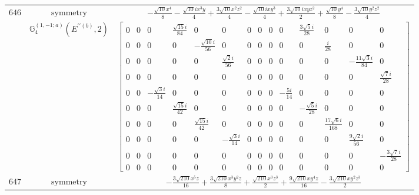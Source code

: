 \documentclass[fleqn,8pt,landscape]{jsarticle}
\begin{document}
\begin{longtable}{ccc}
$ 646 $ & $ \text{symmetry} $ & $ - \frac{\sqrt{10} x^{4}}{8} - \frac{\sqrt{10} i x^{3} y}{4} + \frac{3 \sqrt{10} x^{2} z^{2}}{4} - \frac{\sqrt{10} i x y^{3}}{4} + \frac{3 \sqrt{10} i x y z^{2}}{2} + \frac{\sqrt{10} y^{4}}{8} - \frac{3 \sqrt{10} y^{2} z^{2}}{4} $ \\
$  $ & $ \mathbb{G}_{4}^{(1,-1;a)}(E^{\prime\prime(b)},2) $ & $ \begin{bmatrix} 0 & 0 & 0 & \frac{\sqrt{15} i}{84} & 0 & 0 & 0 & 0 & 0 & 0 & \frac{3 \sqrt{5} i}{28} & 0 & 0 & 0 \\ 0 & 0 & 0 & 0 & - \frac{\sqrt{10} i}{56} & 0 & 0 & 0 & 0 & 0 & 0 & \frac{i}{28} & 0 & 0 \\ 0 & 0 & 0 & 0 & 0 & \frac{\sqrt{2} i}{56} & 0 & 0 & 0 & 0 & 0 & 0 & - \frac{11 \sqrt{3} i}{84} & 0 \\ 0 & 0 & 0 & 0 & 0 & 0 & 0 & 0 & 0 & 0 & 0 & 0 & 0 & \frac{\sqrt{7} i}{28} \\ 0 & 0 & - \frac{\sqrt{3} i}{14} & 0 & 0 & 0 & 0 & 0 & 0 & - \frac{5 i}{14} & 0 & 0 & 0 & 0 \\ 0 & 0 & 0 & \frac{\sqrt{15} i}{42} & 0 & 0 & 0 & 0 & 0 & 0 & - \frac{\sqrt{5} i}{28} & 0 & 0 & 0 \\ 0 & 0 & 0 & 0 & \frac{\sqrt{15} i}{42} & 0 & 0 & 0 & 0 & 0 & 0 & \frac{17 \sqrt{6} i}{168} & 0 & 0 \\ 0 & 0 & 0 & 0 & 0 & - \frac{\sqrt{3} i}{14} & 0 & 0 & 0 & 0 & 0 & 0 & \frac{9 \sqrt{2} i}{56} & 0 \\ 0 & 0 & 0 & 0 & 0 & 0 & 0 & 0 & 0 & 0 & 0 & 0 & 0 & - \frac{3 \sqrt{7} i}{28} \\ 0 & 0 & 0 & 0 & 0 & 0 & 0 & 0 & 0 & 0 & 0 & 0 & 0 & 0 \end{bmatrix} $ \\ \hline
$ 647 $ & $ \text{symmetry} $ & $ - \frac{3 \sqrt{210} x^{5} z}{16} + \frac{3 \sqrt{210} x^{3} y^{2} z}{8} + \frac{\sqrt{210} x^{3} z^{3}}{2} + \frac{9 \sqrt{210} x y^{4} z}{16} - \frac{3 \sqrt{210} x y^{2} z^{3}}{2} $ \\

\end{longtable}
\end{document}
